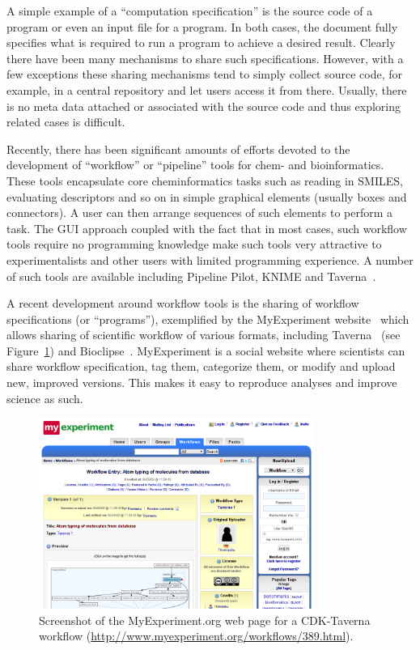 \documentclass[11pt]{book}
\begin{document}
A simple example of a ``computation specification'' is the source code
of a program or even an input file for a program. In both cases, the
document fully specifies what is required to run a program to achieve
a desired result. Clearly there have been many mechanisms to share
such specifications. However, with a few exceptions these sharing
mechanisms tend to simply collect source code, for example, in a
central repository and let users access it from there. Usually, there
is no meta data attached or associated with the source code and thus
exploring related cases is difficult.

Recently, there has been significant amounts of efforts devoted to the
development of ``workflow'' or ``pipeline'' tools for chem- and
bioinformatics. These tools encapsulate core cheminformatics tasks
such as reading in SMILES, evaluating descriptors and so on in simple
graphical elements (usually boxes and connectors). A user can then
arrange sequences of such elements to perform a task. The GUI approach
coupled with the fact that in most cases, such workflow tools require
no programming knowledge make such tools very attractive to
experimentalists and other users with limited programming
experience. A number of such tools are available including Pipeline
Pilot, KNIME and Taverna~\cite{Oinn2004}.

A recent development around workflow tools is the sharing of workflow
specifications (or ``programs''), exemplified by the MyExperiment
website~\cite{Goble2010} which allows sharing of scientific workflow
of various formats, including Taverna~\cite{Oinn2004,Kuhn2010}
(see Figure~\ref{fig:myexperiment})
and Bioclipse~\cite{Spjuth2009,Spjuth2007}.
MyExperiment is a social website where scientists can share
workflow specification, tag them, categorize them, or modify and
upload new, improved versions. This makes it easy to
reproduce analyses and improve science as such.

\begin{figure}[bt]
\begin{center}
\includegraphics[width=0.8\textwidth]{graphics/myexperiment.png}
\end{center}
\caption{Screenshot of the MyExperiment.org web page for a
CDK-Taverna workflow (\url{http://www.myexperiment.org/workflows/389.html}).}
\label{fig:myexperiment}
\end{figure}
\end{document}
